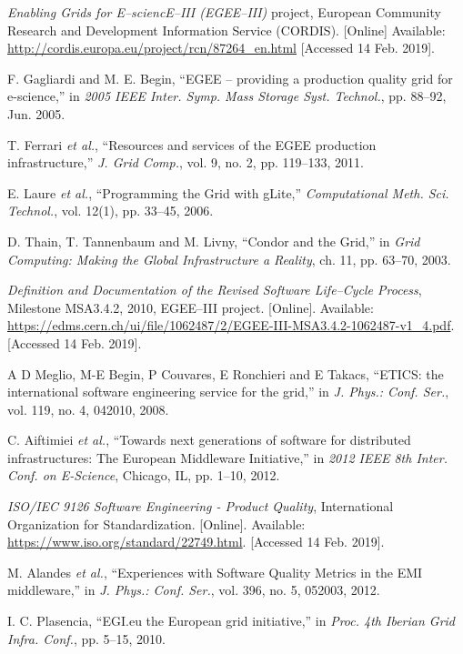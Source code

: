 \begin{thebibliography}{1}
\emph{Enabling Grids for E--sciencE--III (EGEE--III)} project, European Community
Research and Development Information Service (CORDIS).
[Online] Available: \url{http://cordis.europa.eu/project/rcn/87264_en.html}
[Accessed 14 Feb. 2019].

F. Gagliardi and M. E. Begin,
``EGEE -- providing a production quality grid for e-science,''
in \emph{2005 IEEE Inter. Symp. Mass Storage Syst. Technol.},
pp. 88--92, Jun. 2005.

T. Ferrari \emph{et al.},
``Resources and services of the EGEE production infrastructure,''
\emph{J. Grid Comp.},
vol. 9, no. 2, pp. 119--133, 2011.

E. Laure \emph{et al.},
``Programming the Grid with gLite,''
\emph{Computational Meth. Sci. Technol.},
vol. 12(1), pp. 33--45, 2006.

D. Thain, T. Tannenbaum and M. Livny,
``Condor and the Grid,''
in \emph{Grid Computing: Making the Global Infrastructure a Reality},
ch. 11, pp. 63--70, 2003.


\emph{Definition and Documentation of the Revised Software Life--Cycle Process},
Milestone MSA3.4.2, 2010, EGEE--III project.
[Online]. Available: \url{https://edms.cern.ch/ui/file/1062487/2/EGEE-III-MSA3.4.2-1062487-v1_4.pdf}.
[Accessed 14 Feb. 2019].

A D Meglio, M-E Begin, P Couvares, E Ronchieri and E Takacs,
``ETICS: the international software engineering service for the grid,''
in \emph{J. Phys.: Conf. Ser.},
vol. 119, no. 4, 042010, 2008.



C. Aiftimiei \emph{et al.},
``Towards next generations of software for distributed infrastructures: The European Middleware Initiative,''
in \emph{2012 IEEE 8th Inter. Conf. on E-Science},
Chicago, IL, pp. 1--10, 2012.

\emph{ISO/IEC 9126 Software Engineering - Product Quality},
International Organization for Standardization.
[Online]. Available: \url{https://www.iso.org/standard/22749.html}.
[Accessed 14 Feb. 2019].

M. Alandes \emph{et al.},
``Experiences with Software Quality Metrics in the EMI middleware,''
in \emph{J. Phys.: Conf. Ser.},
vol. 396, no. 5, 052003, 2012.

I. C. Plasencia,
``EGI.eu the European grid initiative,''
in \emph{Proc. 4th Iberian Grid Infra. Conf.},
pp. 5--15, 2010.


\end{thebibliography}
